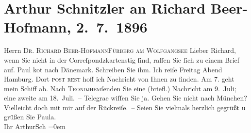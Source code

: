 

         
         \renewcommand{\erwaehntePersonen}{Personen: Richard Beer-Hofmann, Paula Beer-Hofmann, Paul Goldmann}
         \renewcommand{\erwaehnteOrte}{Orte: Dänemark, Fürberg, Hamburg, München, St. Gilgen, Trondheim, VI., Mariahilf, Wien}
         \renewcommand{\erwaehnteWerke}{}
               \section[Arthur Schnitzler an Richard Beer-Hofmann, 2. 7. 1896]{ Arthur Schnitzler an Richard Beer-Hofmann, 2. 7. 1896}\nopagebreak{}\rehead{ }\begin{ledgroupsized}[t]{13cm}\normalsize\beginnumbering{} \toendnotes[C]{\smallbreak\pagebreak[2]} 
\pstart{}{\pb}Herrn \textsc{Dr. Richard
                     Beer-Hofmann}\pend{}\pstart{}\textsc{Fürberg am Wolfgangsee}\pend{}{\bigskip}\pstart
           \noindent{}{\pb}Lieber Richard, wenn Sie nicht in der Correſpondzkartensti{\geminationm}g ſind, raffen Sie ſich zu einem Brief auf. Paul ko{\geminationm}t nach Dänemark. Schreiben Sie ihm. Ich reiſe
                  Freitag Abend Hamburg. Dort \textsc{post rest} hoff ich Nachricht von Ihnen zu finden. Am
                  7. geht mein Schiff ab. Nach \textsc{Trondjhem}ſenden Sie eine \introOben{}(briefl.)\introOben{}
               Nachricht am 9. Juli; eine zweite am 18. Juli. – Telegra{\geminationm}e wiſſen Sie ja. Gehen Sie nicht nach München? Vielleicht doch mit mir auf der
               Rückreiſe. –\pend
           \pstart
           Seien Sie vielmals herzlich gegrüßt u grüßen Sie Paula.{\\[\baselineskip]}Ihr \spacefill\mbox{ArthurSch}\pend
           \leftskip=0em{}
         
         \endnumbering{}\end{ledgroupsized}  \newcommand{\dateiname}{L00559}\newcommand{\titel}{Arthur Schnitzler an Richard Beer-Hofmann, 2. 7. 1896}\newcommand{\editorInnen}{Martin Anton Müller und Gerd-Hermann Susen}
      